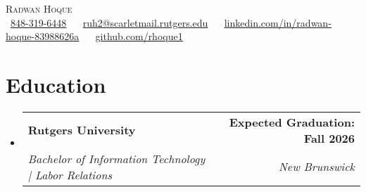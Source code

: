 \documentclass[letterpaper,11pt]{article}
\makeatletter
\newcommand{\resumeSubheading}[4]{
  \vspace{-2pt}\item
    \begin{tabular*}{1.0\textwidth}[t]{l@{\extracolsep{\fill}}r}
      \textbf{#1} & \textbf{\small #2} \\
      \textit{\small#3} & \textit{\small #4} \\
    \end{tabular*}\vspace{-7pt}
}
\newcommand{\resumeSubHeadingListStart}{\begin{itemize}[leftmargin=0.0in, label={}]}
\newcommand{\resumeSubHeadingListEnd}{\end{itemize}}\vspace{0pt}
\makeatother
\begin{document}
\begin{center}
    {\Large \scshape Radwan Hoque} \\[2mm]
    \footnotesize \raisebox{-0.1\height}
    \faPhone\ \underline{848-319-6448} ~ 
    {\faEnvelope\  \underline{ruh2@scarletmail.rutgers.edu}} ~ 
    {\faLinkedin\ \underline{\href{https://www.linkedin.com/in/radwan-hoque-83988626a/}{linkedin.com/in/radwan-hoque-83988626a}}}  ~
    {\faGithub\ \underline{\href{https://github.com/rhoque1}{github.com/rhoque1}}} ~
   
    \vspace{-8pt}
\end{center}

\section{Education} 
  \resumeSubHeadingListStart
    \resumeSubheading
      {Rutgers University}{Expected Graduation: Fall 2026}
      {Bachelor of Information Technology | Labor Relations
      }{New Brunswick}
  \resumeSubHeadingListEnd
    \vspace{-12pt}
\end{document}
